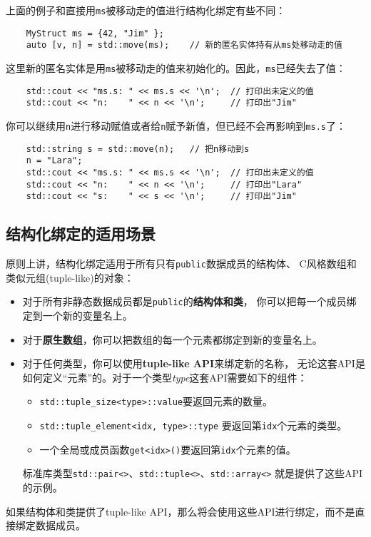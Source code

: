 上面的例子和直接用\texttt{ms}被移动走的值进行结构化绑定有些不同：
\begin{lstlisting}
    MyStruct ms = {42, "Jim" };
    auto [v, n] = std::move(ms);    // 新的匿名实体持有从ms处移动走的值
\end{lstlisting}
这里新的匿名实体是用\texttt{ms}被移动走的值来初始化的。因此，\texttt{ms}已经失去了值：
\begin{lstlisting}
    std::cout << "ms.s: " << ms.s << '\n';  // 打印出未定义的值
    std::cout << "n:    " << n << '\n';     // 打印出"Jim"
\end{lstlisting}
你可以继续用\texttt{n}进行移动赋值或者给\texttt{n}赋予新值，但已经不会再影响到\texttt{ms.s}了：
\begin{lstlisting}
    std::string s = std::move(n);   // 把n移动到s
    n = "Lara";
    std::cout << "ms.s: " << ms.s << '\n';  // 打印出未定义的值
    std::cout << "n:    " << n << '\n';     // 打印出"Lara"
    std::cout << "s:    " << s << '\n';     // 打印出"Jim"
\end{lstlisting}

\subsection{结构化绑定的适用场景}
原则上讲，结构化绑定适用于所有只有\texttt{public}数据成员的结构体、
C风格数组和类似元组(tuple-like)的对象：
\begin{itemize}[leftmargin=*]
    \item 对于所有非静态数据成员都是\texttt{public}的\textbf{结构体和类}，
    你可以把每一个成员绑定到一个新的变量名上。
    \item 对于\textbf{原生数组}，你可以把数组的每一个元素都绑定到新的变量名上。
    \item 对于任何类型，你可以使用\textbf{tuple-like API}来绑定新的名称，
    无论这套API是如何定义“元素”的。对于一个类型\emph{type}这套API需要如下的组件：
    \begin{itemize}[leftmargin=*]
        \item \texttt{std::tuple\_size<type>::value}要返回元素的数量。
        \item \texttt{std::tuple\_element<idx, type>::type}
        要返回第\texttt{idx}个元素的类型。
        \item 一个全局或成员函数\texttt{get<idx>()}要返回第\texttt{idx}个元素的值。
    \end{itemize}
    标准库类型\texttt{std::pair<>}、\texttt{std::tuple<>}、\texttt{std::array<>}
    就是提供了这些API的示例。
\end{itemize}
如果结构体和类提供了tuple-like API，那么将会使用这些API进行绑定，而不是直接绑定数据成员。

